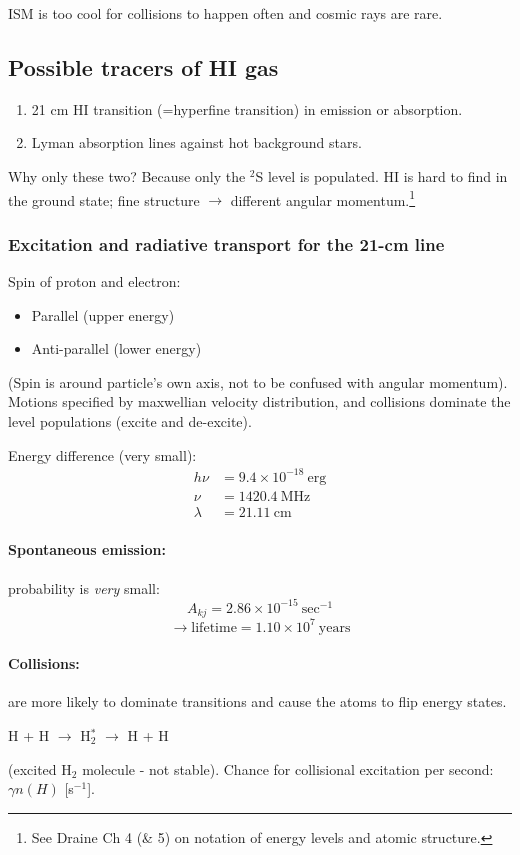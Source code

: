 \documentclass[11pt]{article}
\newcommand{\mar}[1]{\hspace{0pt}\marginpar{-\textcolor{black}{#1}-}}
\begin{document}
ISM is too cool for collisions to happen often and cosmic rays are rare.

\subsection{Possible tracers of HI gas}
\begin{enumerate}[noitemsep]
    \item 21 cm HI transition (=hyperfine transition) in emission or absorption.
    \item Lyman absorption lines against hot background stars.
\end{enumerate}
Why only these two? Because only the $^{2}$S level is populated. HI is hard to
find in the ground state; fine structure $\rightarrow$ different angular
momentum.\footnote{
    See Draine Ch 4 (\& 5) on notation of energy levels and
    atomic structure.}

\newpage
\subsubsection{Excitation and radiative transport for the 21-cm line}
\mar{34}Spin of proton and electron:
\begin{itemize}
    \item Parallel (upper energy)
    \item Anti-parallel (lower energy)
\end{itemize}
(Spin is around particle's own axis, not to be confused with angular
momentum). Motions specified by maxwellian velocity distribution, and
collisions dominate the level populations (excite and de-excite).

Energy difference (very small):
\begin{align*}
    h\nu &= 9.4\times10^{-18}\:\mathrm{erg}\\
    \nu &= 1420.4\:\mathrm{MHz}\\
    \lambda &= 21.11\:\mathrm{cm}
\end{align*}

\paragraph{Spontaneous emission:} probability is \emph{very} small:
\[
    A_{kj} = 2.86\times10^{-15}\:\mathrm{sec}^{-1}
    \]
\[
    \rightarrow \mathrm{lifetime} = 1.10\times10^{7}\:\mathrm{years}
    \]
\paragraph{Collisions:}
are more likely to dominate transitions and cause the atoms to flip energy states.
\begin{center}
    H + H $\rightarrow$ H$_{2}^{*}$ $\rightarrow$ H + H
\end{center}
(excited H$_{2}$ molecule - not stable). Chance for collisional excitation
per second: $\gamma n(H)$ [s$^{-1}$].
\end{document}
